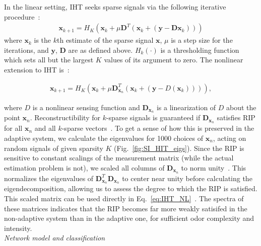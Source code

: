 \documentclass[10pt,prl,aps,showpacs,twocolumn,unsortedaddress,showkeys,linenumbers]{revtex4-1}
\begin{document}
In the linear setting, IHT seeks sparse signals via the following iterative procedure~\cite{IHT}:
\begin{align}
    \mathbf{x}_{k + 1} = H_K(\mathbf{x}_k + \mu\mathbf{D}^T(\mathbf {x}_k + (\mathbf y - \mathbf D\mathbf {x}_k)))
    \label{eq:IHT}
\end{align}
where $\mathbf{x}_k$ is the $k$th estimate of the sparse signal $\mathbf{x}$, $\mu$ is a step size for the iterations, and $\mathbf y$, $\mathbf D$ are as defined above. $H_k(\cdot)$ is a thresholding function which sets all but the largest $K$ values of its argument to zero. The nonlinear extension to IHT is~\cite{nonlin_CS}:

\begin{align}
    \mathbf{x}_{k + 1} = H_K(\mathbf{x}_k + \mu\mathbf{D}_{\mathbf x_n}^T(\mathbf {x}_k + (\mathbf y - D(\mathbf {x}_k)))),
    \label{eq:IHT_NL}
\end{align}

where $D$ is a nonlinear sensing function and $\mathbf{D}_{\mathbf x_n}$ is a linearization of $D$ about the point $\mathbf x_n$. Reconstructibility for $k$-sparse signals is guaranteed if $\mathbf{D}_{\mathbf x_n}$ satisfies RIP for all $\mathbf x_n$ and all $k$-sparse vectors~\cite{IHT}. To get a sense of how this is preserved in the adaptive system, we calculate the eigenvalues for 1000 choices of $\mathbf x_n$, acting on random signals of given sparsity $K$ (Fig.~\ref{fig:SI_HIT_eigs}). Since the RIP is sensitive to constant scalings of the measurement matrix (while the actual estimation problem is not), we scaled all columns of $\mathbf{D}_{\mathbf x_n}$ to norm unity~\cite{using_IHT}. This normalizes the eigenvalues of $\mathbf{D}^T_{\mathbf x_n}\mathbf{D}_{\mathbf x_n}$ to center near unity before calculating the eigendecomposition, allowing us to assess the degree to which the RIP is satisfied. This scaled matrix can be used directly in Eq.~\ref{eq:IHT_NL}~\cite{nonlin_CS,using_IHT}. The spectra of these matrices indicates that the RIP becomes far more weakly satisifed in the non-adaptive system than in the adaptive one, for sufficient odor complexity and intensity. \\

\textit{Network model and classification} \\
\end{document}
